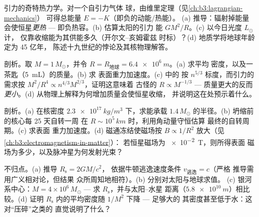 \begin{exercise}[$\star\star$]\label{exo:b3:astrophysics:5}
引力的奇特热力学。对一个自引力气体
球，由维里定理（见\cref{ch:b3:lagrangian-mechanics}）
可得总能量 $E = -K$（即负的动能/热能）。
(a) 推导：辐射掉能量会使恒星\emph{更热}
--- 即负热容。(b) 估算太阳的引力
能 $GM^2/R$。(c) 以今日光度 $L_\odot$ 计，
仅靠收缩能为其供能多久（开尔文–亥姆霍兹
时标）？(d) 地质学将地球年龄定为 45 亿年，
陈述十九世纪的悖论及其核物理解答。
\end{exercise}

\begin{exercise}[$\star\star$]\label{exo:b3:astrophysics:6}
剖析。取 $M = 1\,M_\odot$，并令
$R = R_{\text{地球}} = \qty{6.4e6}{m}$。(a) 求平均
密度，以及一茶匙（\qty{5}{mL}）的质量。(b) 求
表面重力加速度。(c) 中的
按 $n^{5/3}$ 标度，而引力的需求按
$M^2/R^4 \propto n^{4/3}M^{2/3}$，证明这意味着
古怪的 $R \propto M^{-1/3}$ --- 质量更大的反而
\emph{更小}。(d) 从物理上解释为何增加质量会使恒星收缩，
并说明这在处预示着什么。
\end{exercise}

\begin{exercise}[$\star\star$]\label{exo:b3:astrophysics:7}
剖析。(a) 在核密度
$\qty{2.3e17}{kg/m^3}$ 下，求能承载
$1.4\,M_\odot$ 的半径。(b) 坍缩前的核心每 25 天自转一周
在 $R \sim 10^5\,\unit{km}$ 时，利用角动量守恒估算
最终的自转周期。(c) 求表面
重力加速度。(d) 磁通冻结使磁场按
$B \propto 1/R^2$ 放大（见\cref{ch:b3:electromagnetism-in-matter}）：
若恒星磁场为 \qty{e-2}{T}，则所得表面
磁场为多少，以及脉冲星为何发射光束？
\end{exercise}

\begin{exercise}[$\star\star$]\label{exo:b3:astrophysics:8}
不归点。(a) 推导 $R_{\text{s}} = 2GM/c^2$，
依据牛顿逃逸速度条件 $v_{\text{逃逸}} = c$（严格
推导需用广义相对论，但结果
众所周知地相符）。(b) 分别对太阳与地球求值。
(c) 银河系中心：$M = 4\times10^6\,M_\odot$
--- 求 $R_{\text{s}}$，并与太阳–水星
距离（$\qty{5.8e10}{m}$）相比较。(d) 证明
$R_{\text{s}}$ 内的平均密度随 $1/M^2$ 下降 --- 足够大的
其密度甚至低于水：这对“压碎”之类的
直觉说明了什么？
\end{exercise}

